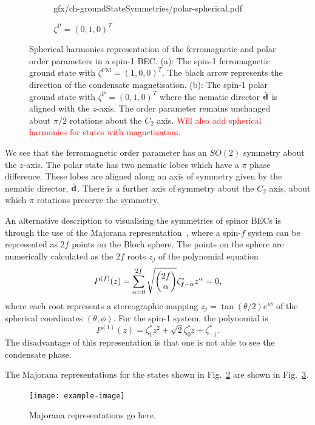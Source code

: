 \begin{figure}
\begin{subfigure}{0.49\textwidth}
        {gfx/ch-groundStateSymmetries/polar-spherical.pdf}
        \caption{\label{subfig: spin-1-polar-spherical}
        \(\zeta^\mathrm{P}={(0, 1, 0)}^T\)}
    \end{subfigure}
    \caption[Spherical harmonic representation of spin-1 ground states]
    {\label{fig: spin-1-spherical-harmonics}
    Spherical harmonics representation of the ferromagnetic and polar order
    parameters in a spin-1 BEC.\@
    (a): The spin-1 ferromagnetic ground state with
    \(\zeta^\mathrm{FM}={(1, 0, 0)}^T\).
    The black arrow represents the direction of the condensate magnetisation.
    (b): The spin-1 polar ground state with
    \(\zeta^\mathrm{P}={(0, 1, 0)}^T\) where the nematic director
    \(\hat{\vb{d}}\) is aligned with the \(z\)-axis.
    The order parameter remains unchanged about \(\pi/2\) rotations about the
    \(C_2\) axis.
    \textcolor{red}{Will also add spherical harmonics for states with
        magnetisation.}}
\end{figure}

We see that the ferromagnetic order parameter has an \(SO(2)\) symmetry about
the \(z\)-axis.
The polar state has two nematic lobes which have a \(\pi \) phase difference.
These lobes are aligned along an axis of symmetry given by the nematic director,
\(\hat{\vb{d}}\).
There is a further axis of symmetry about the \(C_2\) axis, about which \(\pi \)
rotations preserve the symmetry.

An alternative description to visualising the symmetries of spinor BECs is
through the use of the Majorana representation~\cite{Majorana1932,Bloch1945},
where a spin-\(f\) system can be represented as \(2f\) points on the Bloch
sphere.
The points on the sphere are numerically calculated as the \(2f\) roots
\(z_j\) of the polynomial equation
\begin{equation}
    P^{(f)}(z) = \sum_{\alpha = 0}^{2f}
    \sqrt{\mqty(2f \\ \alpha)}\zeta_{f-\alpha}^*z^\alpha=0,
\end{equation}
where each root represents a stereographic mapping
\(z_j=\tan(\theta/2)e^{i\phi}\) of the spherical coordinates \((\theta, \phi)\).
For the spin-1 system, the polynomial is
\begin{equation}
    P^{(1)}(z) = \zeta_1^*z^2+\sqrt{2}\zeta_0^*z+\zeta_{-1}^*.
\end{equation}
The disadvantage of this representation is that one is not able to see the
condensate phase.

The Majorana representations for the states shown in
Fig.~\ref{fig: spin-1-spherical-harmonics} are shown in
Fig.~\ref{fig: spin-1-majorana}.
\begin{figure}
    \centering
    \texttt{[image: example-image]}
    \caption[Majorana representation of spin-1 ground states]
    {\label{fig: spin-1-majorana}Majorana representations go here.}
\end{figure}

